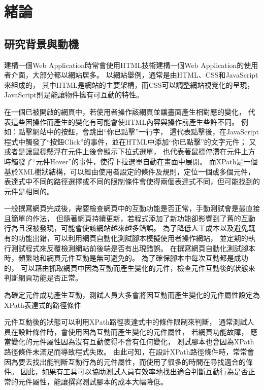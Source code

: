 \chapter{緒論}
\section{研究背景與動機}\label{s1.1}
\indent
建構一個Web Application時常會使用HTML技術建構一個Web Application的使用者介面\cite{Web-application}，大部分都以網站居多。
以網站舉例，通常是由HTML、CSS和JavaScript來組成的\cite{HTML-CSS-JAVASCRIPT}，
其中HTML是網站的主要架構，而CSS可以調整網站視覺化的呈現，JavaScript則是能讓物件擁有可互動的特性。

在一個已被開啟的網頁中，若使用者操作該網頁並讓畫面產生相對應的變化，
代表這些因操作而產生的變化有可能會使HTML內容與操作前產生些許不同。
例如：點擊網站中的按鈕，會跳出``你已點擊''一行字，
這代表點擊後，在JavaScript程式中觸發了``按鈕Click''的事件，並在HTML中添加``你已點擊''的文字元件；
又或者是讓鼠標懸浮在元件上後會顯示下拉式選單，
也代表著鼠標停滯在元件上方時觸發了``元件Hover''的事件，使得下拉選單自動在畫面中展開。
而XPath是一個基於XML樹狀結構，可以經由使用者設定的條件及規則，定位一個或多個元件，
表達式中不同的路徑選擇或不同的限制條件會使得兩個表達式不同，但可能找到的元件是相同的。

\indent
一般撰寫網頁完成後，需要檢查網頁中的互動功能是否正常，手動測試會是最直接且簡單的作法，
但隨著網頁持續更新，若程式添加了新功能卻影響到了舊的互動行為且沒被發現，可能會使該網站越來越多錯誤。
為了降低人工成本以及避免既有的功能出錯，可以利用網頁自動化測試腳本模擬使用者操作網站，
並定期的執行測試程式來反覆檢測網站前後端是否有出現錯誤。
在撰寫網頁自動化測試腳本時，頻繁地和網頁元件互動是無可避免的。
為了確保腳本中每次互動都是成功的，
可以藉由抓取網頁中因為互動而產生變化的元件，檢查元件互動後的狀態來判斷網頁功能是否正常。

\indent
為確定元件成功產生互動，測試人員大多會將因互動而產生變化的元件屬性設定為XPath表達式的路徑條件



元件互動後的狀態可以利用XPath路徑表達式中的條件限制來判斷，
通常測試人員在設計條件時，會使用因為互動而產生變化的元件屬性，
若網頁功能故障，
應當變化的元件屬性因為沒有互動使得不會有任何變化，
測試腳本也會因為XPath路徑條件未滿足而導致程式失敗。
由此可知，在設計XPath路徑條件時，常常會因為要去找出能判斷互動行為的元件屬性，而使用了很多的時間在尋找適合的條件。
因此，如果有工具可以協助測試人員有效率地找出適合判斷互動行為是否正常的元件屬性，能讓撰寫測試腳本的成本大幅降低。

